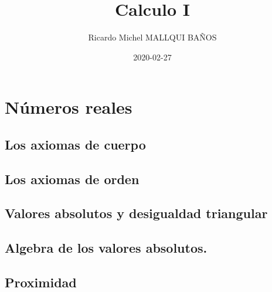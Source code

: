 \documentclass[12pt,]{report}
\title{Calculo I}
\author{Ricardo Michel MALLQUI BAÑOS}
\institute{Universidad Nacional San Cristóbal De Huamanga}
\date{2020-02-27}
\theoremstyle{slplain}
\begin{document}
\maketitle

{
\setcounter{tocdepth}{1}
\tableofcontents
}
\newcommand{\N}{\mathbb{N}}
\newcommand{\R}{\mathbb{R}}
\newcommand{\CC}{\mathbb{C}}
\newcommand{\I}{\mathbb{I}}
\newcommand{\f}{\mathbb{f}}
\newcommand{\X}{\mathbb{X}}
\newcommand{\D}{\mathbb{D}}
\newcommand{\Z}{\mathbb{Z}}
\newcommand{\Q}{\mathbb{Q}}
\newcommand{\norm}[1]{\left\Vert#1\right\Vert}
\newcommand{\abs}[1]{\left\vert#1\right\vert}
\newcommand{\set}[1]{\left\{#1\right\}}
\newcommand{\seq}[1]{\left<#1\right>}
\newcommand{\co}[1]{\left[#1\right]}
\newcommand{\cc}[1]{\left(#1\right)}
\newcommand{\J}{\mathcal{J}}
\newcommand{\K}{\mathcal{K}}
\newcommand{\M}{\mathcal{M}}
\newcommand{\F}{\mathcal{F}}

\hypertarget{nuxfameros-reales}{%
\chapter{Números reales}\label{nuxfameros-reales}}

\hypertarget{los-axiomas-de-cuerpo}{%
\section{Los axiomas de cuerpo}\label{los-axiomas-de-cuerpo}}

\hypertarget{los-axiomas-de-orden}{%
\section{Los axiomas de orden}\label{los-axiomas-de-orden}}

\hypertarget{valores-absolutos-y-desigualdad-triangular}{%
\section{Valores absolutos y desigualdad triangular}\label{valores-absolutos-y-desigualdad-triangular}}

\hypertarget{algebra-de-los-valores-absolutos.}{%
\section{Algebra de los valores absolutos.}\label{algebra-de-los-valores-absolutos.}}

\hypertarget{proximidad}{%
\section{Proximidad}\label{proximidad}}
\end{document}
